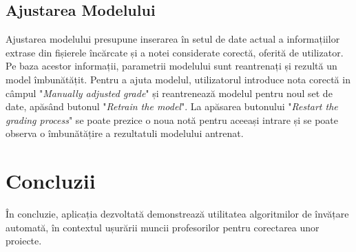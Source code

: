 \documentclass{article}
\begin{document}
\subsection{Ajustarea Modelului}

Ajustarea modelului presupune inserarea în setul de date actual a informațiilor extrase  din fișierele încărcate și a notei considerate corectă, oferită de utilizator. Pe baza acestor informații, parametrii modelului sunt reantrenați și rezultă un model îmbunătățit. Pentru a ajuta modelul, utilizatorul introduce nota corectă in câmpul "\textit{Manually adjusted grade}" și reantrenează modelul pentru noul set de date, apăsând butonul "\textit{Retrain the model}". La apăsarea butonului "\textit{Restart the grading process}" se poate prezice o noua notă pentru aceeași intrare și se poate observa o îmbunătățire a rezultatuli modelului antrenat.

\section{Concluzii}

În concluzie, aplicația dezvoltată demonstrează utilitatea algoritmilor de învățare automată, în contextul ușurării muncii profesorilor pentru corectarea unor proiecte.
\end{document}
